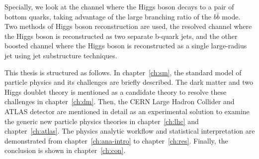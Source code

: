 \par Specially, we look at the channel where the Higgs boson decays to a pair of bottom quarks, taking advantage of the large branching ratio of the $b\bar{b}$ mode. 
Two methods of Higgs boson reconstruction are used, the resolved channel where the Higgs boson is reconstructed as two separate b-quark jets, and the other boosted channel where the Higgs boson is reconstructed as a single large-radius jet using jet substructure techniques.

\par This thesis is structured as follows. 
In chapter~\ref{ch:sm}, the standard model of particle physics and its challenges are briefly described. 
The dark matter and two Higgs doublet theory is mentioned as a candidate theory to resolve these challenges in chapter~\ref{ch:dm}. 
Then, the CERN Large Hadron Collider and ATLAS detector are mentioned in detail as an experimental solution to examine the 
generic new particle physics theories in chapter~\ref{ch:lhc} and chapter~\ref{ch:atlas}. 
The physics analytic workflow and statistical interpretation are demonstrated from chapter~\ref{ch:ana-intro} to chapter~\ref{ch:res}. 
Finally, the conclusion is shown in chapter~\ref{ch:con}.
